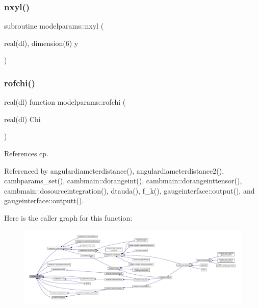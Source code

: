 \subsubsection{\texorpdfstring{nxyl()}{nxyl()}}
{\footnotesize\ttfamily subroutine modelparams\+::nxyl (\begin{DoxyParamCaption}\item[{real(dl), dimension(6)}]{y }\end{DoxyParamCaption})}

\mbox{\label{namespacemodelparams_a09b856ca78d2c38cb9746680ce7a4d9f}} 
\subsubsection{\texorpdfstring{rofchi()}{rofchi()}}
{\footnotesize\ttfamily real(dl) function modelparams\+::rofchi (\begin{DoxyParamCaption}\item[{real(dl)}]{Chi }\end{DoxyParamCaption})}



References cp.



Referenced by angulardiameterdistance(), angulardiameterdistance2(), cambparams\+\_\+set(), cambmain\+::dorangeint(), cambmain\+::dorangeinttensor(), cambmain\+::dosourceintegration(), dtauda(), f\+\_\+k(), gaugeinterface\+::output(), and gaugeinterface\+::outputt().

Here is the caller graph for this function\+:
\nopagebreak
\begin{figure}[H]
\begin{center}
\leavevmode
\includegraphics[width=350pt]{namespacemodelparams_a09b856ca78d2c38cb9746680ce7a4d9f_icgraph}
\end{center}
\end{figure}
\mbox{\label{namespacemodelparams_ade19d5a5ee3bef508e781d64c8c667ae}} 
